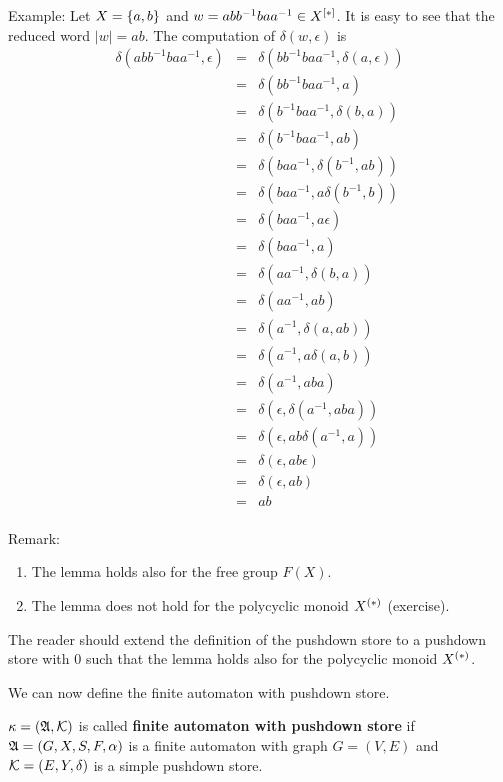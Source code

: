 Example: Let $X=\mbox{$\{a,b\}$}$ and $w=abb^{-1}baa^{-1}\in \mbox{${X}^{[*]}$}$. It is
easy to see that the reduced word $|w|=ab$. The computation of $\delta(w,\epsilon)$ is
\begin{eqnarray*}
\delta(abb^{-1}baa^{-1}, \epsilon)
&=&\delta(bb^{-1}baa^{-1}, \delta(a,\epsilon)) \\
&=&\delta(bb^{-1}baa^{-1}, a) \\
&=&\delta(b^{-1}baa^{-1}, \delta(b, a)) \\
&=&\delta(b^{-1}baa^{-1}, ab)\\
&=&\delta(baa^{-1}, \delta(b^{-1}, ab)) \\
&=&\delta(baa^{-1}, a \delta(b^{-1}, b)) \\
&=&\delta(baa^{-1}, a \epsilon) \\
&=&\delta(baa^{-1}, a) \\
&=&\delta(aa^{-1}, \delta(b,a)) \\
&=&\delta(aa^{-1}, a b) \\
&=&\delta(a^{-1}, \delta(a,ab)) \\
&=&\delta(a^{-1}, a \delta(a,b)) \\
&=&\delta(a^{-1}, a b a) \\
&=&\delta(\epsilon, \delta(a^{-1}, aba)) \\
&=&\delta(\epsilon, a b \delta(a^{-1}, a)) \\
&=&\delta(\epsilon, a b \epsilon) \\
&=&\delta(\epsilon, a b) \\
&=&a b \\
\end{eqnarray*}

Remark:
\begin{enumerate}
  \item The lemma holds also for the free group $F(X)$.
  \item The lemma does not hold for the polycyclic monoid $\mbox{${X}^{(*)}$}$
  (exercise).
\end{enumerate}

The reader should extend the definition of the pushdown store to a
pushdown store with 0 such that the lemma holds also for the polycyclic monoid
$\mbox{${X}^{(*)}$}$.

We can now define the finite automaton with pushdown store.

\begin{definition}
$\kappa = (\mbox{$\mathfrak{A}$}, \mbox{$\mathcal{K}$})$ is called {\bf finite automaton with
pushdown store} if $\mbox{$\mathfrak{A}$} = (G, X, S, F, \alpha)$ is a finite automaton with
graph $G = (V, E)$ and $\mbox{$\mathcal{K}$} = (E, Y,\delta)$ is a simple pushdown store.
\end{definition}

